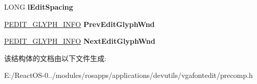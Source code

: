\begin{DoxyCompactItemize}
L\+O\+NG {\bfseries l\+Edit\+Spacing}
\item 
\mbox{\label{struct___e_d_i_t___g_l_y_p_h___i_n_f_o_a3c5ce27672f5e0565ff0de388ec4f07c}} 
\hyperlink{struct___e_d_i_t___g_l_y_p_h___i_n_f_o}{P\+E\+D\+I\+T\+\_\+\+G\+L\+Y\+P\+H\+\_\+\+I\+N\+FO} {\bfseries Prev\+Edit\+Glyph\+Wnd}
\item 
\mbox{\label{struct___e_d_i_t___g_l_y_p_h___i_n_f_o_a47ce8e6736f3c09295946043dd25c13c}} 
\hyperlink{struct___e_d_i_t___g_l_y_p_h___i_n_f_o}{P\+E\+D\+I\+T\+\_\+\+G\+L\+Y\+P\+H\+\_\+\+I\+N\+FO} {\bfseries Next\+Edit\+Glyph\+Wnd}
\end{DoxyCompactItemize}


该结构体的文档由以下文件生成\+:\begin{DoxyCompactItemize}
\item 
E\+:/\+React\+O\+S-\/0../modules/rosapps/applications/devutils/vgafontedit/precomp.\+h\end{DoxyCompactItemize}
